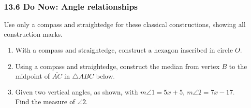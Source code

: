 \documentclass[12pt, twoside]{article}
\begin{document}
\subsubsection*{13.6 Do Now: Angle relationships}
Use only a compass and straightedge for these classical constructions, showing all construction marks.
 \begin{enumerate}

 \item With a compass and straightedge, construct a hexagon inscribed in circle $O$.
   \vspace{0.5cm}
   \begin{center}
   \end{center}
      \vspace{1cm}

   \item Using  a  compass  and  straightedge,  construct the median from vertex $B$ to the midpoint of $\overline{AC}$ in $\triangle ABC$ below.
     \vspace{0.5cm}
   \begin{center}
   \end{center}

 \newpage

 \item Given two vertical angles, as shown, with $m \angle 1 = 5x+5$, $m \angle 2 = 7x-17$. Find the measure of $\angle 2$. \vspace{1cm}
   \begin{flushright}
   \end{flushright}
 \vspace{3cm}



\end{enumerate}
\end{document}

